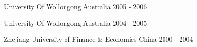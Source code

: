 
\begin{cventries}
  {University Of Wollongong} %
  {Australia} %
  {2005 - 2006} %
  {}

  {University Of Wollongong} %
  {Australia} %
  {2004 - 2005} %
  {}

  {Zhejiang University of Finance \& Economics} %
  {China} %
  {2000 - 2004} %
  {}

\end{cventries}